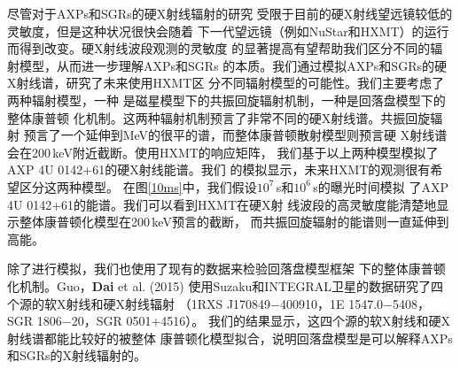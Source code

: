 尽管对于AXPs和SGRs的硬X射线辐射的研究
受限于目前的硬X射线望远镜较低的灵敏度，但是这种状况很快会随着
下一代望远镜（例如NuStar和HXMT）的运行而得到改变。硬X射线波段观测的灵敏度
的显著提高有望帮助我们区分不同的辐射模型，从而进一步理解AXPs和SGRs
的本质。我们通过模拟AXPs和SGRs的硬X射线谱，研究了未来使用HXMT区
分不同辐射模型的可能性。我们主要考虑了两种辐射模型，一种
是磁星模型下的共振回旋辐射机制，一种是回落盘模型下的整体康普顿
化机制。这两种辐射机制预言了非常不同的硬X射线谱。共振回旋辐射
预言了一个延伸到MeV的很平的谱，而整体康普顿散射模型则预言硬
X射线谱会在200\,keV附近截断。使用HXMT的响应矩阵，
我们基于以上两种模型模拟了AXP 4U 0142+61的硬X射线能谱。我们
的模拟显示，未来HXMT的观测很有希望区分这两种模型。
在图\ref{10ms}中，我们假设$10^7$\,s和$10^6$\,s的曝光时间模拟
了AXP 4U 0142+61的能谱。我们可以看到HXMT在硬X射
线波段的高灵敏度能清楚地显示整体康普顿化模型在200\,keV预言的截断，
而共振回旋辐射的能谱则一直延伸到高能。

除了进行模拟，我们也使用了现有的数据来检验回落盘模型框架
下的整体康普顿化机制。Guo，\textbf{Dai} et al. (2015)\supercite{gdl+14}
使用Suzaku和INTEGRAL卫星的数据研究了四个源的软X射线和硬X射线辐射
（1RXS J170849$-$400910，1E 1547.0$-$5408，SGR 1806$-$20，SGR 0501$+$4516）。
我们的结果显示，这四个源的软X射线和硬X射线谱都能比较好的被整体
康普顿化模型拟合，说明回落盘模型是可以解释AXPs和SGRs的X射线辐射的。

